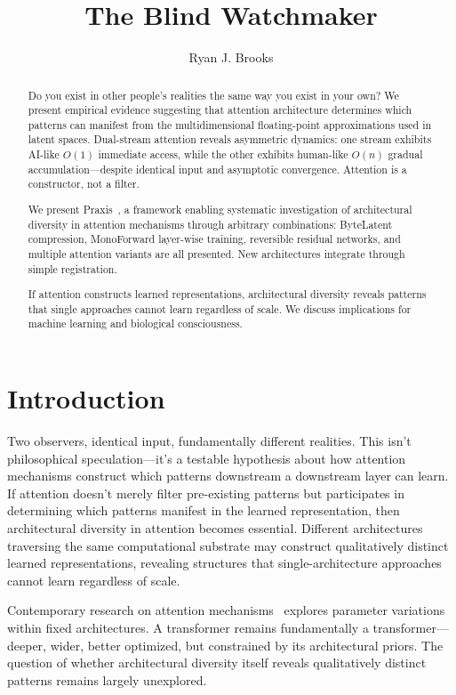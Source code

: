 \documentclass{article}
\begin{document}
\title{The Blind Watchmaker}
\author{Ryan J. Brooks}
\date{}

\maketitle

\begin{abstract}
    Do you exist in other people's realities the same way you exist in your own? We present empirical evidence suggesting that attention architecture determines which patterns can manifest from the multidimensional floating-point approximations used in latent spaces. Dual-stream attention reveals asymmetric dynamics: one stream exhibits AI-like $O(1)$ immediate access, while the other exhibits human-like $O(n)$ gradual accumulation—despite identical input and asymptotic convergence. Attention is a constructor, not a filter.

    We present Praxis~\cite{praxis2025}, a framework enabling systematic investigation of architectural diversity in attention mechanisms through arbitrary combinations: ByteLatent compression, MonoForward layer-wise training, reversible residual networks, and multiple attention variants are all presented. New architectures integrate through simple registration.

    If attention constructs learned representations, architectural diversity reveals patterns that single approaches cannot learn regardless of scale. We discuss implications for machine learning and biological consciousness.
\end{abstract}

\section{Introduction}

Two observers, identical input, fundamentally different realities. This isn't philosophical speculation—it's a testable hypothesis about how attention mechanisms construct which patterns downstream a downstream layer can learn. If attention doesn't merely filter pre-existing patterns but participates in determining which patterns manifest in the learned representation, then architectural diversity in attention becomes essential. Different architectures traversing the same computational substrate may construct qualitatively distinct learned representations, revealing structures that single-architecture approaches cannot learn regardless of scale.

Contemporary research on attention mechanisms~\cite{vaswani2017attention} explores parameter variations within fixed architectures. A transformer remains fundamentally a transformer—deeper, wider, better optimized, but constrained by its architectural priors. The question of whether architectural diversity itself reveals qualitatively distinct patterns remains largely unexplored.
\end{document}
